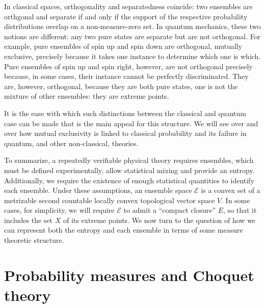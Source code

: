 \documentclass[10pt,twocolumn, nofootinbib]{revtex4-2}
\newcommand{\Ens}[1][E] {\mathcal{#1}} %
\begin{document}
In classical spaces, orthogonality and separatedness coincide: two ensembles are orthgonal and separate if and only if the support of the respective probability distributions overlap on a non-measure-zero set. In quantum mechanics, these two notions are different: any two pure states are separate but are not orthogonal. For example, pure ensembles of spin up and spin down are orthogonal, mutually exclusive, precisely because it takes one instance to determine which one is which. Pure ensembles of spin up and spin right, however, are not orthogonal precisely because, in some cases, their instance cannot be perfectly discriminated. They are, however, orthogonal, because they are both pure states, one is not the mixture of other ensembles: they are extreme points.

It is the ease with which such distinctions between the classical and quantum case can be made that is the main appeal for this structure. We will see over and over how mutual exclusivity is linked to classical probability and its failure in quantum, and other non-classical, theories.

To summarize, a repeatedly verifiable physical theory requires ensembles, which must be defined experimentally, allow statistical mixing and provide an entropy. Additionally, we require the existence of enough statistical quantities to identify each ensemble. Under these assumptions, an ensemble space $\Ens$ is a convex set of a metrizable second countable locally convex topological vector space $V$. In some cases, for simplicity, we will require $\Ens$ to admit a ``compact closure'' $E$, so that it includes the set $X$ of its extreme points. We now turn to the question of how we can represent both the entropy and each ensemble in terms of some measure theoretic structure.

\section{Probability measures and Choquet theory}
\end{document}
